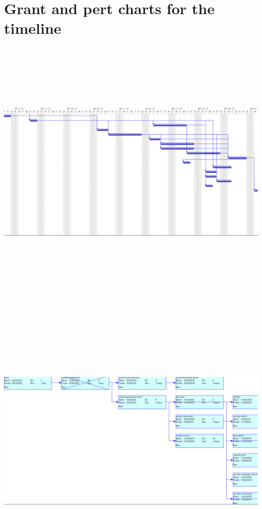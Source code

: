 \documentclass[titlepage]{article}
\begin{document}
\section{Grant and pert charts for the timeline}
\includegraphics[width=19cm, height=13cm]{grant}\\
\break
\includegraphics[width=20cm, height=15cm]{pert1}\\
\end{document}
